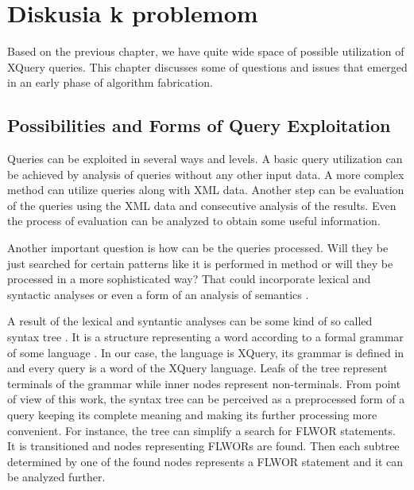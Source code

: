 \chapter{Diskusia k problemom}
Based on the previous chapter, we have quite wide space of possible utilization of XQuery queries. This chapter discusses some of questions and issues that emerged in an early phase of algorithm fabrication.

\section{Possibilities and Forms of Query Exploitation}
Queries can be exploited in several ways and levels. A basic query utilization can be achieved by analysis of queries without any other input data. A more complex method can utilize queries along with XML data. Another step can be evaluation of the queries using the XML data and consecutive analysis of the results. Even the process of evaluation can be analyzed to obtain some useful information. 


Another important question is how can be the queries processed. Will they be just searched for certain patterns like it is performed in method \cite{Necasky:2009:DXK:1529282.1529414} or will they be processed in a more sophisticated way? That could incorporate lexical and syntactic analyses  or even a form of an analysis of semantics .

A result of the lexical and syntantic analyses can be some kind of so called syntax tree . It is a structure representing a word according to a formal grammar of some language . In our case, the language is XQuery, its grammar is defined in  and every query is a word of the XQuery language. Leafs of the tree represent terminals of the grammar while inner nodes represent non-terminals.  From point of view of this work, the syntax tree can be perceived as a preprocessed form of a query keeping its complete meaning and making its further processing more convenient. For instance, the tree can simplify a search for FLWOR statements. It is transitioned and nodes representing FLWORs are found. Then each subtree determined by one of the found nodes represents a FLWOR statement and it can be analyzed further.

